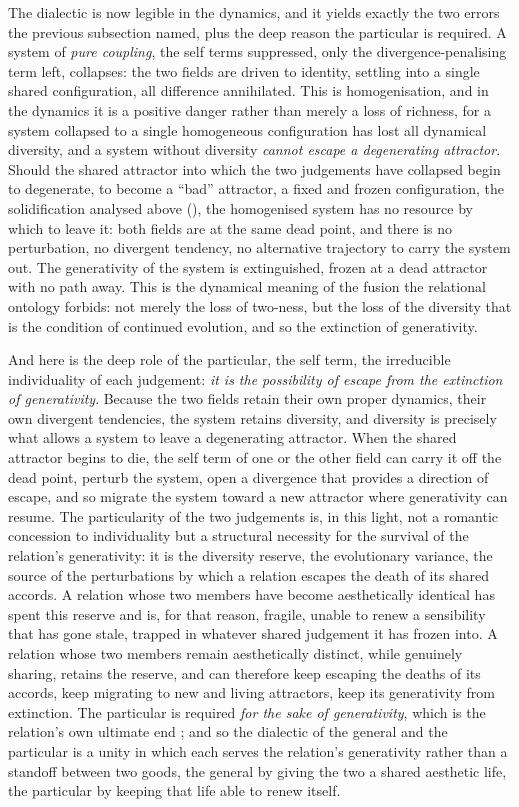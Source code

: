 The dialectic is now legible in the dynamics, and it yields exactly the two errors the previous subsection named, plus the deep reason the particular is required. A system of \emph{pure coupling}, the self terms suppressed, only the divergence-penalising term left, collapses: the two fields are driven to identity, settling into a single shared configuration, all difference annihilated. This is homogenisation, and in the dynamics it is a positive danger rather than merely a loss of richness, for a system collapsed to a single homogeneous configuration has lost all dynamical diversity, and a system without diversity \emph{cannot escape a degenerating attractor}. Should the shared attractor into which the two judgements have collapsed begin to degenerate, to become a ``bad'' attractor, a fixed and frozen configuration, the solidification analysed above (), the homogenised system has no resource by which to leave it: both fields are at the same dead point, and there is no perturbation, no divergent tendency, no alternative trajectory to carry the system out. The generativity of the system is extinguished, frozen at a dead attractor with no path away. This is the dynamical meaning of the fusion the relational ontology forbids: not merely the loss of two-ness, but the loss of the diversity that is the condition of continued evolution, and so the extinction of generativity.

And here is the deep role of the particular, the self term, the irreducible individuality of each judgement: \emph{it is the possibility of escape from the extinction of generativity}. Because the two fields retain their own proper dynamics, their own divergent tendencies, the system retains diversity, and diversity is precisely what allows a system to leave a degenerating attractor. When the shared attractor begins to die, the self term of one or the other field can carry it off the dead point, perturb the system, open a divergence that provides a direction of escape, and so migrate the system toward a new attractor where generativity can resume. The particularity of the two judgements is, in this light, not a romantic concession to individuality but a structural necessity for the survival of the relation's generativity: it is the diversity reserve, the evolutionary variance, the source of the perturbations by which a relation escapes the death of its shared accords. A relation whose two members have become aesthetically identical has spent this reserve and is, for that reason, fragile, unable to renew a sensibility that has gone stale, trapped in whatever shared judgement it has frozen into. A relation whose two members remain aesthetically distinct, while genuinely sharing, retains the reserve, and can therefore keep escaping the deaths of its accords, keep migrating to new and living attractors, keep its generativity from extinction. The particular is required \emph{for the sake of generativity}, which is the relation's own ultimate end \parencite{paperix}; and so the dialectic of the general and the particular is a unity in which each serves the relation's generativity rather than a standoff between two goods, the general by giving the two a shared aesthetic life, the particular by keeping that life able to renew itself.

